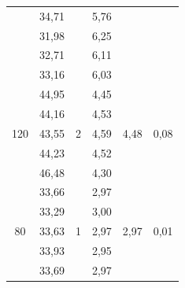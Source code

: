 \documentclass[a4paper, 12pt]{article}
\begin{document}
\begin{table}[H]
\begin{tabular}{|c|ccccc|}
             & \multicolumn{1}{c|}{34,71} & \multicolumn{1}{c|}{} & \multicolumn{1}{c|}{5,76} & \multicolumn{1}{c|}{} &  \\ \cline{2-2} \cline{4-4}
             & \multicolumn{1}{c|}{31,98} & \multicolumn{1}{c|}{} & \multicolumn{1}{c|}{6,25} & \multicolumn{1}{c|}{} &  \\ \cline{2-2} \cline{4-4}
             & \multicolumn{1}{c|}{32,71} & \multicolumn{1}{c|}{} & \multicolumn{1}{c|}{6,11} & \multicolumn{1}{c|}{} &  \\ \cline{2-2} \cline{4-4}
             & \multicolumn{1}{c|}{33,16} & \multicolumn{1}{c|}{} & \multicolumn{1}{c|}{6,03} & \multicolumn{1}{c|}{} &  \\ \hline
            \multirow{5}{*}{120} & \multicolumn{1}{c|}{44,95} & \multicolumn{1}{c|}{\multirow{5}{*}{2}} & \multicolumn{1}{c|}{4,45} & \multicolumn{1}{c|}{\multirow{5}{*}{4,48}} & \multirow{5}{*}{0,08} \\ \cline{2-2} \cline{4-4}
             & \multicolumn{1}{c|}{44,16} & \multicolumn{1}{c|}{} & \multicolumn{1}{c|}{4,53} & \multicolumn{1}{c|}{} &  \\ \cline{2-2} \cline{4-4}
             & \multicolumn{1}{c|}{43,55} & \multicolumn{1}{c|}{} & \multicolumn{1}{c|}{4,59} & \multicolumn{1}{c|}{} &  \\ \cline{2-2} \cline{4-4}
             & \multicolumn{1}{c|}{44,23} & \multicolumn{1}{c|}{} & \multicolumn{1}{c|}{4,52} & \multicolumn{1}{c|}{} &  \\ \cline{2-2} \cline{4-4}
             & \multicolumn{1}{c|}{46,48} & \multicolumn{1}{c|}{} & \multicolumn{1}{c|}{4,30} & \multicolumn{1}{c|}{} &  \\ \hline
            \multirow{5}{*}{80} & \multicolumn{1}{c|}{33,66} & \multicolumn{1}{c|}{\multirow{5}{*}{1}} & \multicolumn{1}{c|}{2,97} & \multicolumn{1}{c|}{\multirow{5}{*}{2,97}} & \multirow{5}{*}{0,01} \\ \cline{2-2} \cline{4-4}
             & \multicolumn{1}{c|}{33,29} & \multicolumn{1}{c|}{} & \multicolumn{1}{c|}{3,00} & \multicolumn{1}{c|}{} &  \\ \cline{2-2} \cline{4-4}
             & \multicolumn{1}{c|}{33,63} & \multicolumn{1}{c|}{} & \multicolumn{1}{c|}{2,97} & \multicolumn{1}{c|}{} &  \\ \cline{2-2} \cline{4-4}
             & \multicolumn{1}{c|}{33,93} & \multicolumn{1}{c|}{} & \multicolumn{1}{c|}{2,95} & \multicolumn{1}{c|}{} &  \\ \cline{2-2} \cline{4-4}
             & \multicolumn{1}{c|}{33,69} & \multicolumn{1}{c|}{} & \multicolumn{1}{c|}{2,97} & \multicolumn{1}{c|}{} &  \\ \hline

\end{tabular}
\end{table}
\end{document}
